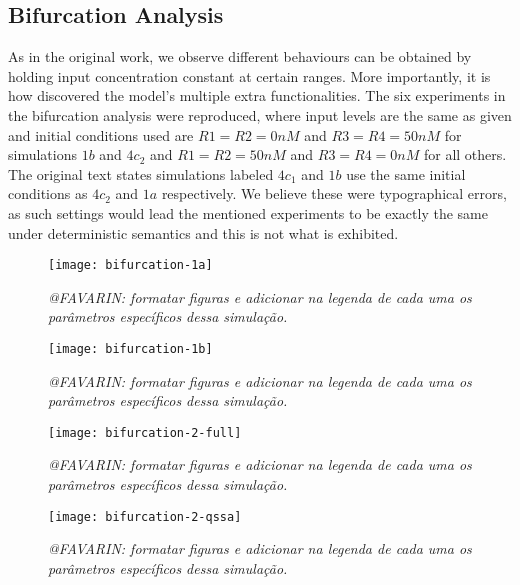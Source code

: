   \subsection{Bifurcation Analysis}

    As in the original work, we observe different behaviours can be obtained by holding input concentration constant at certain ranges.
    More importantly, it is how \citet{originals} discovered the model's multiple extra functionalities.
    The six experiments in the bifurcation analysis were reproduced, where input levels are the same as given and initial conditions used are $R1=R2=0nM$ and $R3=R4=50nM$ for simulations $1b$ and $4c_{2}$ and $R1=R2=50nM$ and $R3=R4=0nM$ for all others.
    The original text states simulations labeled $4c_{1}$ and $1b$ use the same initial conditions as $4c_{2}$ and $1a$ respectively.
    We believe these were typographical errors, as such settings would lead the mentioned experiments to be exactly the same under deterministic semantics and this is not what is exhibited.

    \begin{figure}[!htbp]
      \centering
      \texttt{[image: bifurcation-1a]}
      \caption{\textit{@FAVARIN: formatar figuras e adicionar na legenda de cada uma os parâmetros específicos dessa simulação.}}
      \label{fig.bifurcation-1a}
    \end{figure}

    \begin{figure}[!htbp]
      \centering
      \texttt{[image: bifurcation-1b]}
      \caption{\textit{@FAVARIN: formatar figuras e adicionar na legenda de cada uma os parâmetros específicos dessa simulação.}}
      \label{fig.bifurcation-1b}
    \end{figure}

    \begin{figure}[!htbp]
      \centering
      \texttt{[image: bifurcation-2-full]}
      \caption{\textit{@FAVARIN: formatar figuras e adicionar na legenda de cada uma os parâmetros específicos dessa simulação.}}
      \label{fig.bifurcation-2-full}
    \end{figure}

    \begin{figure}[!htbp]
      \centering
      \texttt{[image: bifurcation-2-qssa]}
      \caption{\textit{@FAVARIN: formatar figuras e adicionar na legenda de cada uma os parâmetros específicos dessa simulação.}}
      \label{fig.bifurcation-2-qssa}
    \end{figure}


